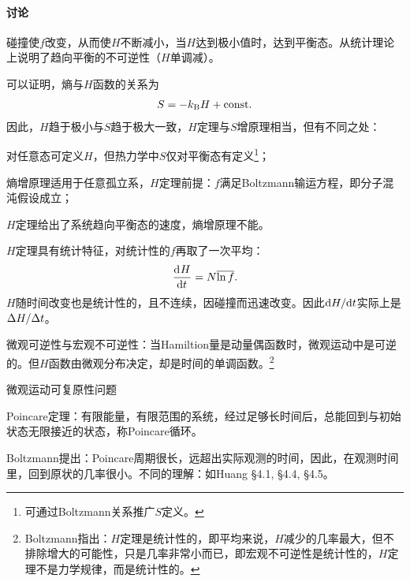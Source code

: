 \paragraph{讨论}
\begin{compactenum}
	\item 碰撞使$f$改变，从而使$H$不断减小，当$H$达到极小值时，达到平衡态。从统计理论上说明了趋向平衡的不可逆性（$H$单调减）。
	\item 可以证明，熵与$H$函数的关系为
	\begin{align}
		S=-k_{\mathrm B} H+\text{const}.
	\end{align}
	因此，$H$趋于极小与$S$趋于极大一致，$H$定理与$S$增原理相当，但有不同之处：
	\begin{compactitem}
		\item 对任意态可定义$H$，但热力学中$S$仅对平衡态有定义\footnote{可通过Boltzmann关系推广$S$定义。}；
		\item 熵增原理适用于任意孤立系，$H$定理前提：$f$满足Boltzmann输运方程，即分子混沌假设成立；
		\item $H$定理给出了系统趋向平衡态的速度，熵增原理不能。
	\end{compactitem}
	\item $H$定理具有统计特征，对统计性的$f$再取了一次平均：
	\[
		\frac{\mathrm{d}^{{}}H}{\mathrm{d}{t}^{{}}}=N\overline{\ln f}.
	\]
	$H$随时间改变也是统计性的，且不连续，因碰撞而迅速改变。因此$\mathop{}\!\mathrm{d} H/\mathrm{d} t$实际上是$\Delta H/\Delta t$。
	\item 微观可逆性与宏观不可逆性：当Hamiltion量是动量偶函数时，微观运动中是可逆的。但$H$函数由微观分布决定，却是时间的单调函数。\footnote{Boltzmann指出：$H$定理是统计性的，即平均来说，$H$减少的几率最大，但不排除增大的可能性，只是几率非常小而已，即宏观不可逆性是统计性的，$H$定理不是力学规律，而是统计性的。}	
	\item 微观运动可复原性问题
	
	Poincare定理：有限能量，有限范围的系统，经过足够长时间后，总能回到与初始状态无限接近的状态，称Poincare循环。

	Boltzmann提出：Poincare周期很长，远超出实际观测的时间，因此，在观测时间里，回到原状的几率很小。不同的理解：如Huang \S 4.1, \S 4.4, \S 4.5。
\end{compactenum}